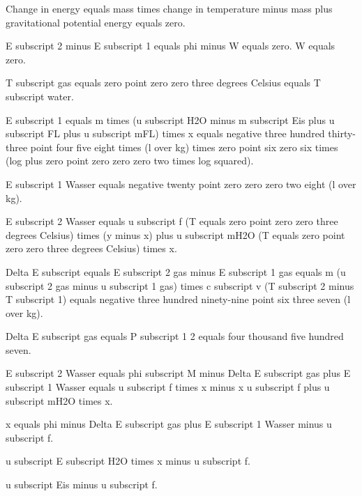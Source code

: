 Change in energy equals mass times change in temperature minus mass plus gravitational potential energy equals zero.

E subscript 2 minus E subscript 1 equals phi minus W equals zero. W equals zero.

T subscript gas equals zero point zero zero three degrees Celsius equals T subscript water.

E subscript 1 equals m times (u subscript H2O minus m subscript Eis plus u subscript FL plus u subscript mFL) times x equals negative three hundred thirty-three point four five eight times (l over kg) times zero point six zero six times (log plus zero point zero zero zero two times log squared).

E subscript 1 Wasser equals negative twenty point zero zero zero two eight (l over kg).

E subscript 2 Wasser equals u subscript f (T equals zero point zero zero three degrees Celsius) times (y minus x) plus u subscript mH2O (T equals zero point zero zero three degrees Celsius) times x.

Delta E subscript equals E subscript 2 gas minus E subscript 1 gas equals m (u subscript 2 gas minus u subscript 1 gas) times c subscript v (T subscript 2 minus T subscript 1) equals negative three hundred ninety-nine point six three seven (l over kg).

Delta E subscript gas equals P subscript 1 2 equals four thousand five hundred seven.

E subscript 2 Wasser equals phi subscript M minus Delta E subscript gas plus E subscript 1 Wasser equals u subscript f times x minus x u subscript f plus u subscript mH2O times x.

x equals phi minus Delta E subscript gas plus E subscript 1 Wasser minus u subscript f.

u subscript E subscript H2O times x minus u subscript f. 

u subscript Eis minus u subscript f.